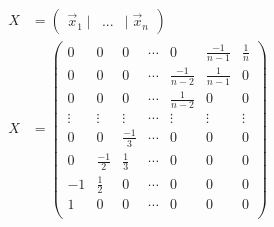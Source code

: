 \documentclass[12pt]{article}
\begin{document}
\begin{enumerate}
\begin{enumerate}
        \begin{align*}
          X &= \left(\begin{array}{ccc} 
              \vec{x}_1 \;| & ... & |\; \vec{x}_n
            \end{array}\right) \\
          X &= \left(
            \begin{array}{ccccccc} 
              0&0&0& \cdots &0 &\frac{-1}{n-1}&\frac{1}{n} \\
              0&0&0& \cdots & \frac{-1}{n-2} &\frac{1}{n-1}&0 \\
              0&0&0& \cdots & \frac{1}{n-2} &0&0 \\
              \vdots & \vdots & \vdots & \cdots & \vdots & \vdots & \vdots \\
              0&0& \frac{-1}{3} & \cdots & 0&0&0 \\
              0&\frac{-1}{2}& \frac{1}{3} & \cdots & 0&0&0 \\
              -1&\frac{1}{2}& 0 & \cdots & 0&0&0 \\
              1&0& 0 & \cdots & 0&0&0 \\
            \end{array}
          \right)
        \end{align*}

          
    \end{enumerate}

\end{enumerate}
\end{document}
